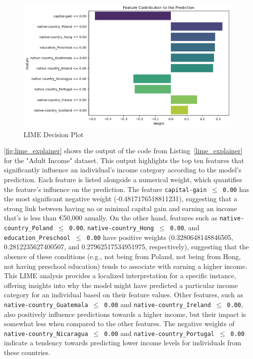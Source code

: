 \documentclass[10pt,journal,compsoc]{IEEEtran}
\begin{document}
\begin{figure}[H]
    \centering
    \includegraphics[width=1\linewidth]{images/lime_summary_plot.png}
    \caption{LIME Decision Plot}
    \label{fig:lime_explainer}
\end{figure}

\autoref{fig:lime_explainer} shows the output of the code from Listing~\ref{lime_explainer} for the "Adult Income" dataset. This output highlights the top ten features that significantly influence an individual's income category according to the model's prediction.
Each feature is listed alongside a numerical weight, which quantifies the feature's influence on the prediction. 
The feature \texttt{capital-gain $\leq$ 0.00} has the most significant negative weight (-0.4817176518811231), suggesting that a strong link between having no or minimal capital gain and earning an income that's is less than €50,000 anually. On the other hand, features such as \texttt{native-country\_Poland $\leq$ 0.00}, \texttt{native-country\_Hong $\leq$ 0.00}, and \texttt{education\_Preschool $\leq$ 0.00} have positive weights 
(0.3280648148846505, 0.2812235627400507, and 0.27962517534951975, respectively), suggesting that the absence of these conditions (e.g., not being from Poland, not being from Hong, not having preschool education) tends to associate with earning a higher income. This LIME analysis provides a localized interpretation for a specific instance, offering insights into why the model might have predicted a particular income category for an individual based on their feature values. 
Other features, such as \texttt{native-country\_Guatemala $\leq$ 0.00} and \texttt{native-country\_Ireland $\leq$ 0.00}, also positively influence predictions towards a higher income, but their impact is somewhat less when compared to the other features. The negative weights of \texttt{native-country\_Nicaragua $\leq$ 0.00} 
and \texttt{native-country\_Portugal $\leq$ 0.00} indicate a tendency towards predicting lower income levels for individuals from these countries.
\end{document}
